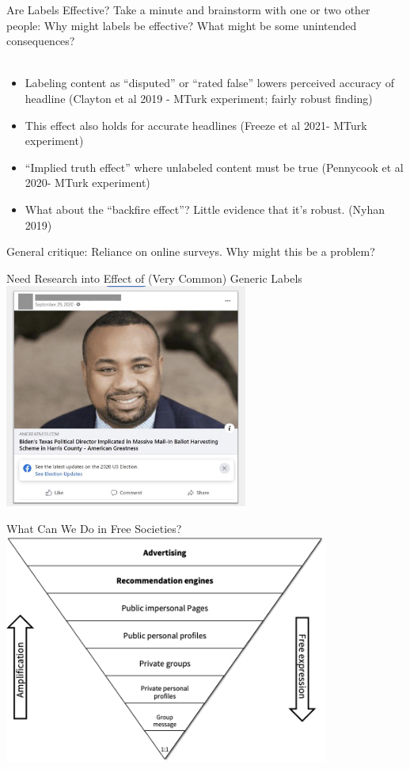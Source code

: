 \documentclass[nobackground,dvipsnames,table,aspectratio=169]{beamer}
\begin{document}
\begin{frame}{Are Labels Effective?}
    Take a minute and brainstorm with one or two other people: Why might labels be effective? What might be some unintended consequences?\\~\\
    \begin{itemize}
        \item Labeling content as “disputed” or “rated false” lowers perceived accuracy of headline (Clayton et al 2019 - MTurk experiment; fairly robust finding)
        \item This effect also holds for accurate headlines (Freeze et al 2021- MTurk experiment)
        \item “Implied truth effect” where unlabeled content must be true (Pennycook et al 2020- MTurk experiment)
        \item What about the “backfire effect”? Little evidence that it’s robust. (Nyhan 2019)
    \end{itemize}
    General critique: Reliance on online surveys. Why might this be a problem?
\end{frame}

\begin{frame}{Need Research into Effect of (Very Common) Generic Labels}
    \centering
    \includegraphics[width=0.6\textwidth]{labeling-impact}
\end{frame}

\begin{frame}{What Can We Do in Free Societies?}
    \centering
    \includegraphics[width=0.8\textwidth]{amplification-pyramid}
\end{frame}
\end{document}
